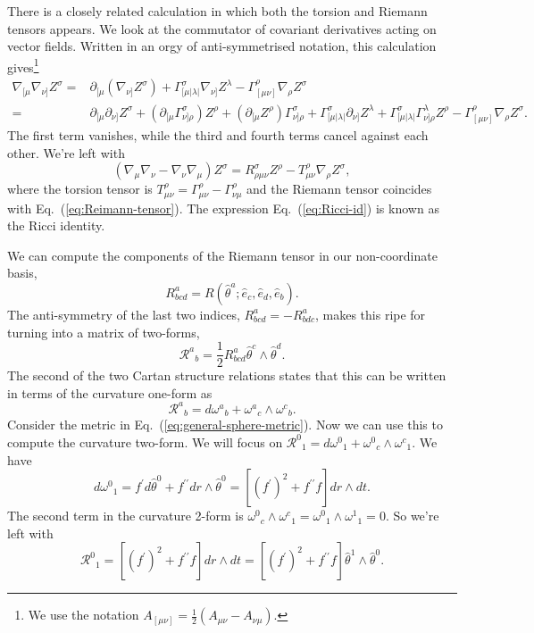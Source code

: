 \documentclass[aps,prb,superscriptaddress,nofootinbib]{revtex4}
\begin{document}
There is a closely related calculation in which both the torsion and Riemann tensors appears. We look at the commutator of covariant derivatives acting on vector fields. Written in an orgy of anti-symmetrised notation, this calculation gives\footnote{We use the notation $A_{[\mu\nu]} = \frac{1}{2}(A_{\mu\nu}-A_{\nu\mu})$.}
$$
\begin{aligned}
\nabla_{[\mu} \nabla_{\nu]} Z^\sigma= & \partial_{[\mu}\left(\nabla_{\nu]} Z^\sigma\right)+\Gamma_{[\mu|\lambda|}^\sigma \nabla_{\nu]} Z^\lambda-\Gamma_{[\mu \nu]}^\rho \nabla_\rho Z^\sigma \\
= & \partial_{[\mu} \partial_{\nu]} Z^\sigma+\left(\partial_{[\mu} \Gamma_{\nu] \rho}^\sigma\right) Z^\rho+\left(\partial_{[\mu} Z^\rho\right) \Gamma_{\nu] \rho}^\sigma+\Gamma_{[\mu|\lambda|}^\sigma \partial_{\nu]} Z^\lambda +\Gamma_{[\mu|\lambda|}^\sigma \Gamma_{\nu] \rho}^\lambda Z^\rho-\Gamma_{[\mu \nu]}^\rho \nabla_\rho Z^\sigma.
\end{aligned}
$$
The first term vanishes, while the third and fourth terms cancel against each other. We're left with
\begin{equation}\label{eq:Ricci-id}
	(\nabla_\mu\nabla_\nu - \nabla_\nu \nabla_\mu) Z^\sigma=R_{\rho \mu \nu}^\sigma Z^\rho-T_{\mu \nu}^\rho \nabla_\rho Z^\sigma,
\end{equation}
where the torsion tensor is $T_{\mu \nu}^\rho= \Gamma_{\mu\nu}^\rho - \Gamma_{\nu\mu}^\rho$ and the Riemann tensor coincides with Eq.~(\ref{eq:Reimann-tensor}). 
The expression Eq.~(\ref{eq:Ricci-id}) is known as the Ricci identity.

We can compute the components of the Riemann tensor in our non-coordinate basis,
$$
	R_{b c d}^a=R\left(\hat{\theta}^a ; \hat{e}_c, \hat{e}_d, \hat{e}_b\right).
$$
The anti-symmetry of the last two indices, $R_{b c d}^a=-R_{b d c}^a$, makes this ripe for turning into a matrix of two-forms,
\begin{equation}
	\mathcal{R}^a{}_b=\frac{1}{2} R_{b c d}^a \hat{\theta}^c \wedge \hat{\theta}^d.
\end{equation}
The second of the two Cartan structure relations states that this can be written in terms of the curvature one-form as
\begin{equation}
	\mathcal{R}^a{}_b = d \omega^a{}_b + \omega^a{}_c \wedge \omega^c{}_b.
\end{equation}
Consider the metric in Eq.~(\ref{eq:general-sphere-metric}).
Now we can use this to compute the curvature two-form. We will focus on $\mathcal{R}^0{}_1=d \omega^0{}_1+\omega^0{}_c \wedge \omega^c{}_1$.
We have
$$
	d \omega^0{}_1 = f^{\prime} d \hat{\theta}^0+f^{\prime \prime} d r \wedge \hat{\theta}^0=\left[\left(f^{\prime}\right)^2+f^{\prime \prime} f\right] d r \wedge d t.
$$
The second term in the curvature 2-form is $\omega^0{}_c \wedge \omega^c{}_1=\omega^0{}_1 \wedge \omega^1{}_1=0$. So we're left with
$$
\mathcal{R}^0{}_1=\left[\left(f^{\prime}\right)^2+f^{\prime \prime} f\right] d r \wedge d t=\left[\left(f^{\prime}\right)^2+f^{\prime \prime} f\right] \hat{\theta}^1 \wedge \hat{\theta}^0.
$$
\end{document}
